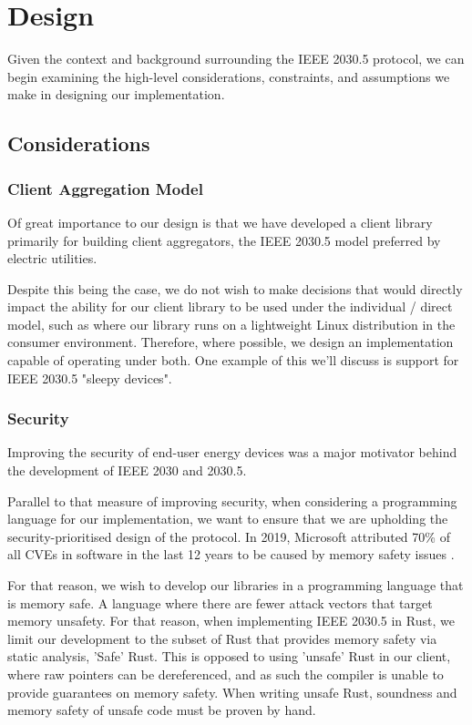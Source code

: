 \chapter{Design}\label{ch:design}
Given the context and background surrounding the IEEE 2030.5 protocol, we can begin examining the high-level considerations, constraints, and assumptions we make in designing our implementation.

\section{Considerations}

\subsection{Client Aggregation Model}
Of great importance to our design is that we have developed a client library primarily for building client aggregators, the IEEE 2030.5 model preferred by electric utilities.

Despite this being the case, we do not wish to make decisions that would directly impact the ability for our client library to be used under the individual / direct model, such as where our library runs on a lightweight Linux distribution in the consumer environment. Therefore, where possible, we design an implementation capable of operating under both. One example of this we'll discuss is support for IEEE 2030.5 "sleepy devices".

\subsection{Security}
Improving the security of end-user energy devices was a major motivator behind the development of IEEE 2030 and 2030.5. 

Parallel to that measure of improving security, when considering a programming language for our implementation, we want to ensure that we are upholding the security-prioritised design of the protocol. In 2019, Microsoft attributed 70\% of all CVEs in software in the last 12 years to be caused by memory safety issues \cite[]{SecurityMemorySafety}. 

For that reason, we wish to develop our libraries in a programming language that is memory safe. A language where there are fewer attack vectors that target memory unsafety. For that reason, when implementing IEEE 2030.5 in Rust, we limit our development to the subset of Rust that provides memory safety via static analysis, 'Safe' Rust. This is opposed to using 'unsafe' Rust in our client, where raw pointers can be dereferenced, and as such the compiler is unable to provide guarantees on memory safety. When writing unsafe Rust, soundness and memory safety of unsafe code must be proven by hand.


